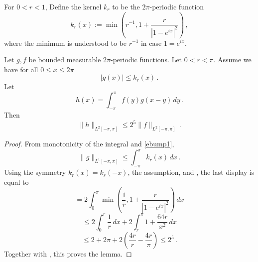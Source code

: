 For $0<r<1$, Define the kernel $k_r$ to be the $2\pi$-periodic function
\begin{equation}
    k_r(x):=\min \left(r^{-1}, 1+\frac r{|1-e^{ix}|^2}\right)\, ,
\end{equation}
where the minimum is understood to be $r^{-1}$ in case $1=e^{ix}$.
\begin{lemma}
\label{integrable-bump-convolution}
\leanok
{}
Let $g,f$ be bounded measurable $2\pi$-periodic functions. Let $0<r<\pi$.
Assume we have for all $0\le x\le 2\pi$
\begin{equation}\label{ebump1}
    |g(x)|\le k_r(x)\, .
\end{equation}
Let
\begin{equation}
   h(x)= \int_{-\pi}^{\pi} f(y)g(x-y)\, dy \, .
\end{equation}
Then
\begin{equation}
   \|h\|_{L^2[-\pi, \pi]}\le 2^{5}\|f\|_{L^2[-\pi, \pi]} \, .
\end{equation}

\end{lemma}

\begin{proof}
\leanok
From monotonicity of the integral and \eqref{ebump1},
\begin{equation}
    \|g\|_{L^1[-\pi, \pi]} \le \int_{-\pi}^{\pi}k_r(x)\, dx\,.
\end{equation}
Using the symmetry
$k_r(x)=k_r(-x)$, the assumption, and , the last display
is equal to
\begin{equation*}
    = 2 \int_0^\pi \min\left(\frac 1r, 1+\frac r{|1-e^{ix}|^2}\right)\, dx
\end{equation*}
\begin{equation*}
    \le 2\int_0^{r} \frac 1r \, dx+2\int_r^{\pi}1+\frac {64r}{x^2}\, dx
\end{equation*}
\begin{equation}
    \le 2+2\pi + 2\left(\frac {4r}r-\frac {4r}{\pi}\right)
    \le 2^{5}\, .
\end{equation}
    Together with , this proves the lemma.
\end{proof}

